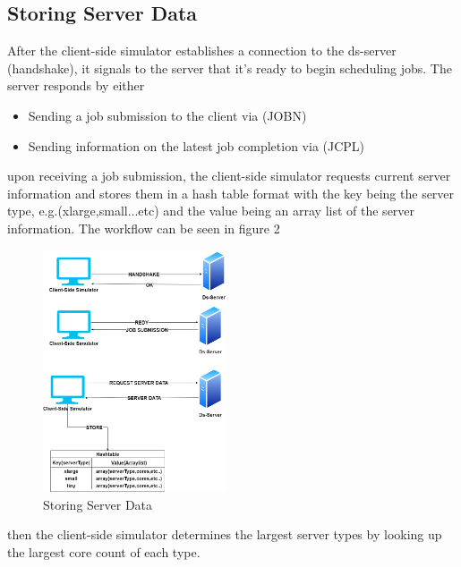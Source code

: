 \documentclass[a4paper]{article} %
\begin{document}
 

\subsection{Storing Server Data}
After the client-side simulator establishes a connection to the ds-server (handshake), it signals to the server that it's ready to begin scheduling jobs. The server responds by either 
\begin{itemize}
    \item Sending a job submission to the client via (JOBN)
    \item Sending information on the latest job completion via (JCPL)
\end{itemize}
upon receiving a job submission, the client-side simulator requests current server information and stores them in a hash table format with the key being the server type, e.g.(xlarge,small...etc) and the value being an array list of the server information. The workflow can be seen in figure 2
\begin{figure}[!htb]
    \centering
    \includegraphics[width = 54mm, scale = 1]{Storing server info.png}
    \caption{Storing Server Data}
    \label{Server Data}
\end{figure}
\newpage
then the client-side simulator determines the largest server types by looking up the largest core count of each type. 
\end{document}
